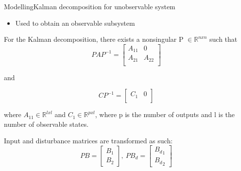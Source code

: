 
\begin{frame}{Modelling}{Kalman decomposition for unobservable system}
	\begin{itemize}
		\item Used to obtain an observable subsystem
	\end{itemize}
	For the Kalman decomposition, there exists a nonsingular P  $\in \mathbb{R} ^{n x n}$ such that
	\begin{equation}
		PAP^{-1} = \begin{bmatrix}
			A_{11}       & 0 \\
			A_{21}       & A_{22} \\
		\end{bmatrix}
	\end{equation}
	
	and
	
	\begin{equation}
		CP^{-1} = \begin{bmatrix}
			C_{1}       & 0 \\
		\end{bmatrix}
	\end{equation}
	
	where $A_{11} \in \mathbb{R} ^{l x l}$ and $C_{1} \in \mathbb{R} ^{p x l}$, where p is the number of outputs and l is the number of observable states.
	
	Input and disturbance matrices are transformed as such:
	\begin{equation}
		PB = \begin{bmatrix}
			B_1 \\
			B_2
		\end{bmatrix}, \
		PB_d = \begin{bmatrix}
			{B_d}_1 \\
			{B_d}_2
		\end{bmatrix}
	\end{equation}
\end{frame}




